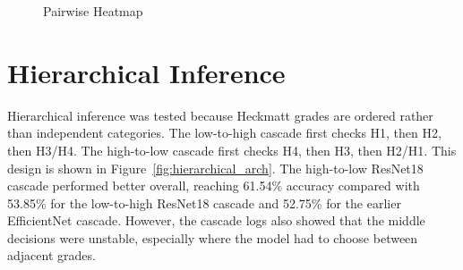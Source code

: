 \begin{figure}[H]
    \centering
    \caption{Pairwise Heatmap}
    \label{fig:diagrams}
\end{figure}

\section{Hierarchical Inference}
Hierarchical inference was tested because Heckmatt grades are ordered rather than independent categories. The low-to-high cascade first checks H1, then H2, then H3/H4. The high-to-low cascade first checks H4, then H3, then H2/H1. This design is shown in Figure~\ref{fig:hierarchical_arch}. The high-to-low ResNet18 cascade performed better overall, reaching 61.54\% accuracy compared with 53.85\% for the low-to-high ResNet18 cascade and 52.75\% for the earlier EfficientNet cascade. However, the cascade logs also showed that the middle decisions were unstable, especially where the model had to choose between adjacent grades.

\begin{table}[H]
\centering
\scriptsize
{}
\caption{Hierarchical cascade comparison}
\label{tab:cascade_comparison}
\end{table}

\begin{table}[H]
\centering
\scriptsize
{}
\caption{ResNet18 high-to-low cascade confusion matrix}
\label{tab:resnet_high_low_cm}
\end{table}

